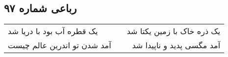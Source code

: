 \begin{center}
\section*{رباعی شماره ۹۷}
\label{sec:sh097}
\begin{longtable}{l p{0.5cm} r}
یک قطره آب بود با دریا شد
&&
یک ذره خاک با زمین یکتا شد
\\
آمد شدن تو اندرین عالم چیست
&&
آمد مگسی پدید و ناپیدا شد
\\
\end{longtable}
\end{center}
